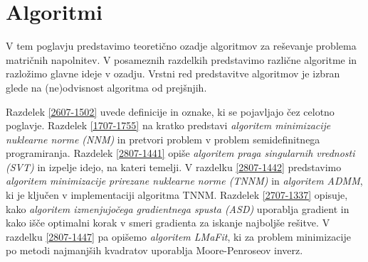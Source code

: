 \chapter{Algoritmi} \label{1407-1011}

V tem poglavju predstavimo teoretično ozadje algoritmov za reševanje problema matričnih napolnitev. V posameznih razdelkih predstavimo različne algoritme in  razložimo glavne ideje v ozadju. Vrstni red predstavitve algoritmov je izbran glede na (ne)odvisnost algoritma od prejšnjih.

Razdelek \ref{2607-1502} uvede definicije in oznake, ki se pojavljajo čez celotno poglavje. Razdelek \ref{1707-1755} na kratko predstavi \textit{algoritem minimizacije nuklearne norme (NNM)} in pretvori problem v problem semidefinitnega programiranja.
Razdelek \ref{2807-1441} opiše \textit{algoritem praga singularnih vrednosti (SVT)} in izpelje idejo, na kateri temelji. 
V razdelku \ref{2807-1442} predstavimo \textit{algoritem minimizacije prirezane nuklearne norme (TNNM)} in \textit{algoritem ADMM}, ki je ključen v implementaciji algoritma TNNM.
Razdelek \ref{2707-1337} opisuje, kako \textit{algoritem izmenjujočega gradientnega spusta (ASD)} uporablja gradient in kako išče optimalni korak v smeri gradienta za iskanje najboljše rešitve.
V razdelku \ref{2807-1447} pa opišemo \textit{algoritem LMaFit}, ki za problem minimizacije po metodi najmanjših kvadratov uporablja Moore-Penroseov inverz. 

